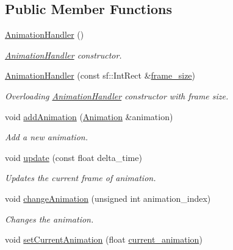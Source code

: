 \subsection*{Public Member Functions}
\begin{DoxyCompactItemize}
\item 
\hyperlink{class_animation_handler_ae10c29a1cb88b70f31034da4b863098c}{Animation\+Handler} ()
\begin{DoxyCompactList}\small\item\em \hyperlink{class_animation_handler}{Animation\+Handler} constructor. \end{DoxyCompactList}\item 
\hyperlink{class_animation_handler_a4d7522e516b77aa5ebd9340561156369}{Animation\+Handler} (const sf\+::\+Int\+Rect \&\hyperlink{class_animation_handler_a8615fd6169591c5788c9f6a83cdf0ec7}{frame\+\_\+size})
\begin{DoxyCompactList}\small\item\em Overloading \hyperlink{class_animation_handler}{Animation\+Handler} constructor with frame size. \end{DoxyCompactList}\item 
void \hyperlink{class_animation_handler_ae517a14ed199418ccbc8d71db5ad5955}{add\+Animation} (\hyperlink{class_animation}{Animation} \&animation)
\begin{DoxyCompactList}\small\item\em Add a new animation. \end{DoxyCompactList}\item 
void \hyperlink{class_animation_handler_a74c541905109998e971c578c4aa3e3de}{update} (const float delta\+\_\+time)
\begin{DoxyCompactList}\small\item\em Updates the current frame of animation. \end{DoxyCompactList}\item 
void \hyperlink{class_animation_handler_a93f1509e5eccdf13a07ba1eb2256c6d0}{change\+Animation} (unsigned int animation\+\_\+index)
\begin{DoxyCompactList}\small\item\em Changes the animation. \end{DoxyCompactList}\item 
void \hyperlink{class_animation_handler_ae9cc10dd30d2c48eedb400d32b6eb4b6}{set\+Current\+Animation} (float \hyperlink{class_animation_handler_ad03db9fa9c9589a72b438033b283a9cb}{current\+\_\+animation})
\end{DoxyCompactItemize}
